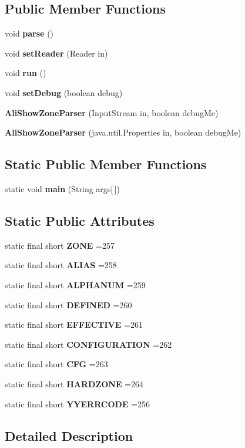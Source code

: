 \subsection*{Public Member Functions}
\begin{DoxyCompactItemize}
\item 
void {\bf parse} ()
\item 
void {\bf set\-Reader} (Reader in)
\item 
void {\bf run} ()
\item 
void {\bf set\-Debug} (boolean debug)
\item 
{\bf Ali\-Show\-Zone\-Parser} (Input\-Stream in, boolean debug\-Me)
\item 
{\bf Ali\-Show\-Zone\-Parser} (java.\-util.\-Properties in, boolean debug\-Me)
\end{DoxyCompactItemize}
\subsection*{Static Public Member Functions}
\begin{DoxyCompactItemize}
\item 
static void {\bf main} (String args[$\,$])
\end{DoxyCompactItemize}
\subsection*{Static Public Attributes}
\begin{DoxyCompactItemize}
\item 
static final short {\bf Z\-O\-N\-E} =257
\item 
static final short {\bf A\-L\-I\-A\-S} =258
\item 
static final short {\bf A\-L\-P\-H\-A\-N\-U\-M} =259
\item 
static final short {\bf D\-E\-F\-I\-N\-E\-D} =260
\item 
static final short {\bf E\-F\-F\-E\-C\-T\-I\-V\-E} =261
\item 
static final short {\bf C\-O\-N\-F\-I\-G\-U\-R\-A\-T\-I\-O\-N} =262
\item 
static final short {\bf C\-F\-G} =263
\item 
static final short {\bf H\-A\-R\-D\-Z\-O\-N\-E} =264
\item 
static final short {\bf Y\-Y\-E\-R\-R\-C\-O\-D\-E} =256
\end{DoxyCompactItemize}


\subsection{Detailed Description}


